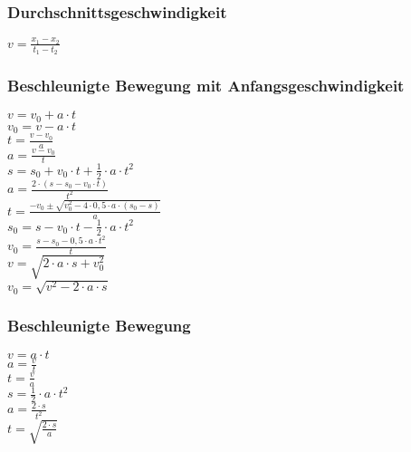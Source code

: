 \subsubsection{Durchschnittsgeschwindigkeit} 
\begin{minipage}{0.45\textwidth} 
$ v = \frac{x_{1}  - x_{2} }{t_{1}  - t_{2} } $\\ 
\end{minipage} 
\begin{minipage}{0.45\textwidth} 
 
\end{minipage} 
\subsubsection{Beschleunigte Bewegung mit Anfangsgeschwindigkeit} 
\begin{minipage}{0.45\textwidth} 
$ v = v_{0}  + a\cdot t $\\ 
$ v_{0}  = v - a\cdot t $\\ 
$ t = \frac{v - v_{0} }{a} $\\ 
$ a = \frac{v - v_{0} }{  t} $\\ 
$ s = s_{0}  + v_{0} \cdot t + \frac{1}{2}\cdot a\cdot t^{2} $\\ 
$ a = \frac{2\cdot (s - s_{0}  - v_{0} \cdot t)}{     t^{2} } $\\ 
$ t = \frac{-v_{0}  \pm \sqrt{v_{0} ^{2} -4\cdot 0,5\cdot a\cdot (s_{0}  -s)}}{       a} $\\ 
$ s_{0}  = s - v_{0} \cdot t - \frac{1}{2}\cdot a\cdot t^{2} $\\ 
$ v_{0}  =\frac{s-s_{0} -0,5\cdot a\cdot t^{2} }{    t} $\\ 
$ v  =\sqrt{2\cdot a \cdot s+ v_{0}^2} $\\ 
$ v_{0}  =\sqrt{v^2-2\cdot a \cdot s} $\\ 
\end{minipage} 
\begin{minipage}{0.45\textwidth} 
 
\end{minipage} 
\subsubsection{Beschleunigte Bewegung} 
\begin{minipage}{0.45\textwidth} 
$ v = a\cdot t $\\ 
$ a = \frac{v}{t} $\\ 
$ t = \frac{v}{a} $\\ 
$ s = \frac{1}{2}\cdot a\cdot t^{2} $\\ 
$ a = \frac{2\cdot s}{t^{2} } $\\ 
$ t = \sqrt{\frac{2\cdot s}{a}} $\\ 
\end{minipage} 
\begin{minipage}{0.45\textwidth} 
 
\end{minipage} 
